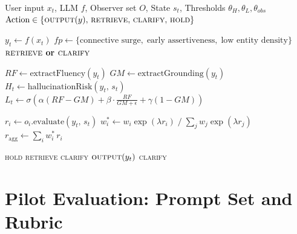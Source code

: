 \documentclass[11pt,a4paper]{article}
\begin{document}
\begin{algorithm}
\caption{ReikaSystem External Control Logic}
\label{alg:control}
\begin{algorithmic}[1]
\Require User input $x_t$, LLM $f$, Observer set $O$, State $s_t$, Thresholds $\theta_H,\theta_L,\theta_{obs}$
\Ensure $\text{Action} \in \{\textsc{output}(y),\,\textsc{retrieve},\,\textsc{clarify},\,\textsc{hold}\}$

\State $y_t \leftarrow f(x_t)$ 
\State $\mathit{fp} \leftarrow \{\text{connective surge},\;\text{early assertiveness},\;\text{low entity density}\}$
 
  \State \Return $\textsc{retrieve}$ \textbf{or} $\textsc{clarify}$
\EndIf

\State $RF \leftarrow \mathrm{extractFluency}(y_t)$
\State $GM \leftarrow \mathrm{extractGrounding}(y_t)$
\State $H_t \leftarrow \mathrm{hallucinationRisk}(y_t,\,s_t)$
\State $L_t \leftarrow \sigma\!\left(\alpha(RF-GM)+\beta\cdot\frac{RF}{GM+\epsilon}+\gamma(1-GM)\right)$

  \State $r_i \leftarrow o_i.\mathrm{evaluate}(y_t,\,s_t)$
\EndFor
\State $w_i^{*} \leftarrow w_i\exp(\lambda r_i)\;/\;\sum_j w_j\exp(\lambda r_j)$ 
\State $r_{\mathrm{agg}} \leftarrow \sum_i w_i^{*}\,r_i$

  \State \Return \textsc{hold} 
  \State \Return \textsc{retrieve} 
  \State \Return \textsc{clarify} 
\Else
    \State \Return $\textsc{output}(y_t)$ 
  \Else
    \State \Return \textsc{clarify} 
  \EndIf
\EndIf
\end{algorithmic}
\end{algorithm}

\section{Pilot Evaluation: Prompt Set and Rubric}
\label{app:prompts}
\end{document}
